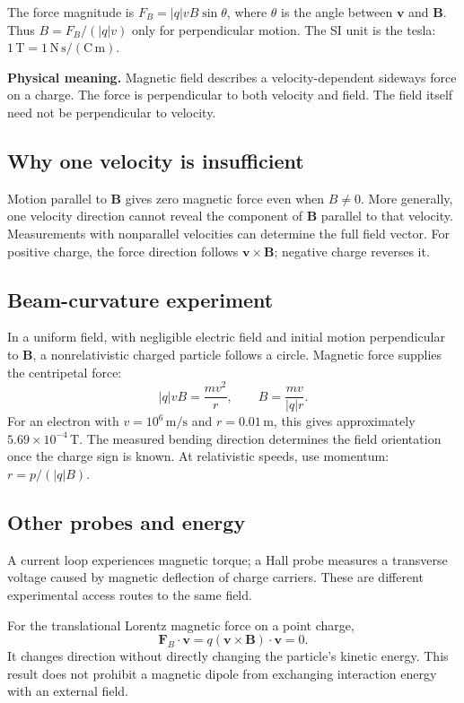 \documentclass[11pt,letterpaper]{article}
\newcommand{\vect}[1]{\boldsymbol{#1}}
\newcommand{\idea}[1]{\par\smallskip\noindent\colorbox{pale}{\parbox{\dimexpr\linewidth-2\fboxsep\relax}{\textbf{Physical meaning.} #1}}\par\smallskip}
\begin{document}
The force magnitude is $F_B=|q|vB\sin\theta$, where $\theta$ is the angle between $\vect v$ and $\vect B$. Thus $B=F_B/(|q|v)$ only for perpendicular motion. The SI unit is the tesla: $1\,\mathrm T=1\,\mathrm{N\,s/(C\,m)}$.

\idea{Magnetic field describes a velocity-dependent sideways force on a charge. The force is perpendicular to both velocity and field. The field itself need not be perpendicular to velocity.}

\subsection*{Why one velocity is insufficient}
Motion parallel to $\vect B$ gives zero magnetic force even when $B\ne0$. More generally, one velocity direction cannot reveal the component of $\vect B$ parallel to that velocity. Measurements with nonparallel velocities can determine the full field vector. For positive charge, the force direction follows $\vect v\times\vect B$; negative charge reverses it.

\subsection*{Beam-curvature experiment}
In a uniform field, with negligible electric field and initial motion perpendicular to $\vect B$, a nonrelativistic charged particle follows a circle. Magnetic force supplies the centripetal force:
\[
|q|vB=\frac{mv^2}{r},\qquad B=\frac{mv}{|q|r}.
\]
For an electron with $v=10^6\,\mathrm{m/s}$ and $r=0.01\,\mathrm m$, this gives approximately $5.69\times10^{-4}\,\mathrm T$. The measured bending direction determines the field orientation once the charge sign is known. At relativistic speeds, use momentum: $r=p/(|q|B)$.

\subsection*{Other probes and energy}
A current loop experiences magnetic torque; a Hall probe measures a transverse voltage caused by magnetic deflection of charge carriers. These are different experimental access routes to the same field.

For the translational Lorentz magnetic force on a point charge,
\[
\vect F_B\cdot\vect v=q(\vect v\times\vect B)\cdot\vect v=0.
\]
It changes direction without directly changing the particle's kinetic energy. This result does not prohibit a magnetic dipole from exchanging interaction energy with an external field.
\end{document}
